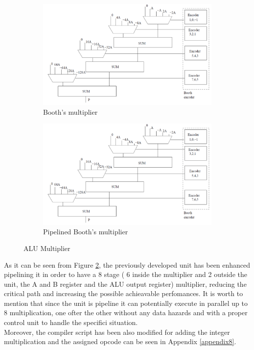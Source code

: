 \begin{figure}[!htbp]
\begin{subfigure}{.5\textwidth}
  \centering
  \includegraphics[scale=0.5,width=1\linewidth]{./chapters/figures/mult.PNG}  
  \caption{Booth's multiplier}
  \label{fig:alumula}
\end{subfigure}
\begin{subfigure}{.5\textwidth}
  \centering
  \includegraphics[scale=0.5,width=1\linewidth]{./chapters/figures/mult_pip.PNG}  
  \caption{Pipelined Booth's multiplier\protect\footnotemark[1]}
  \label{fig:alumulb}
\end{subfigure}
\caption{ALU Multiplier}
\label{fig:alumul}
\end{figure}
As it can be seen from Figure \ref{fig:alumulb}, the previously developed unit has been enhanced pipelining it in order to have a 8 stage ( 6 inside the multiplier and 2 outside the unit, the A and B register and the ALU output register) multiplier, reducing the critical path and increasing the possible achieavable perfomances. It is worth to mention that since the unit is pipeline it can potentially execute in parallel up to 8 multiplication, one ofter the other without any data hazards and with a proper control unit to handle the specifici situation.\\
Moreover, the compiler script has been also modified for adding the integer multiplication and the assigned opcode can be seen in Appendix \ref{appendix8}.